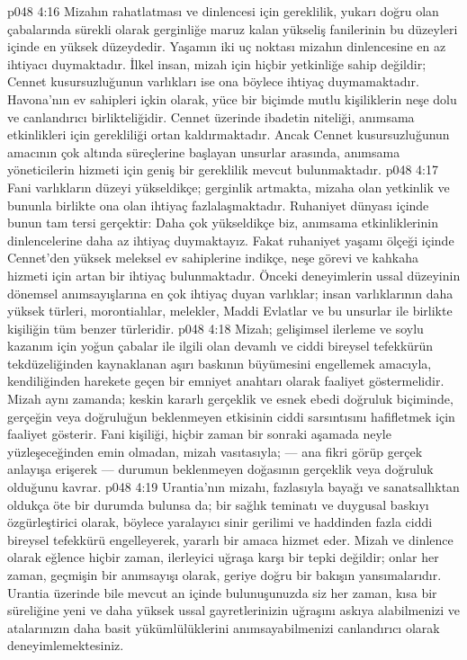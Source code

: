 \vs p048 4:16 Mizahın rahatlatması ve dinlencesi için gereklilik, yukarı doğru olan çabalarında sürekli olarak gerginliğe maruz kalan yükseliş fanilerinin bu düzeyleri içinde en yüksek düzeydedir. Yaşamın iki uç noktası mizahın dinlencesine en az ihtiyacı duymaktadır. İlkel insan, mizah için hiçbir yetkinliğe sahip değildir; Cennet kusursuzluğunun varlıkları ise ona böylece ihtiyaç duymamaktadır. Havona’nın ev sahipleri içkin olarak, yüce bir biçimde mutlu kişiliklerin neşe dolu ve canlandırıcı birlikteliğidir. Cennet üzerinde ibadetin niteliği, anımsama etkinlikleri için gerekliliği ortan kaldırmaktadır. Ancak Cennet kusursuzluğunun amacının çok altında süreçlerine başlayan unsurlar arasında, anımsama yöneticilerin hizmeti için geniş bir gereklilik mevcut bulunmaktadır.
\vs p048 4:17 Fani varlıkların düzeyi yükseldikçe; gerginlik artmakta, mizaha olan yetkinlik ve bununla birlikte ona olan ihtiyaç fazlalaşmaktadır. Ruhaniyet dünyası içinde bunun tam tersi gerçektir: Daha çok yükseldikçe biz, anımsama etkinliklerinin dinlencelerine daha az ihtiyaç duymaktayız. Fakat ruhaniyet yaşamı ölçeği içinde Cennet’den yüksek meleksel ev sahiplerine indikçe, neşe görevi ve kahkaha hizmeti için artan bir ihtiyaç bulunmaktadır. Önceki deneyimlerin ussal düzeyinin dönemsel anımsayışlarına en çok ihtiyaç duyan varlıklar; insan varlıklarının daha yüksek türleri, morontialılar, melekler, Maddi Evlatlar ve bu unsurlar ile birlikte kişiliğin tüm benzer türleridir.
\vs p048 4:18 Mizah; gelişimsel ilerleme ve soylu kazanım için yoğun çabalar ile ilgili olan devamlı ve ciddi bireysel tefekkürün tekdüzeliğinden kaynaklanan aşırı baskının büyümesini engellemek amacıyla, kendiliğinden harekete geçen bir emniyet anahtarı olarak faaliyet göstermelidir. Mizah aynı zamanda; keskin kararlı gerçeklik ve esnek ebedi doğruluk biçiminde, gerçeğin veya doğruluğun beklenmeyen etkisinin ciddi sarsıntısını hafifletmek için faaliyet gösterir. Fani kişiliği, hiçbir zaman bir sonraki aşamada neyle yüzleşeceğinden emin olmadan, mizah vasıtasıyla; --- ana fikri görüp gerçek anlayışa erişerek --- durumun beklenmeyen doğasının gerçeklik veya doğruluk olduğunu kavrar.
\vs p048 4:19 Urantia’nın mizahı, fazlasıyla bayağı ve sanatsallıktan oldukça öte bir durumda bulunsa da; bir sağlık teminatı ve duygusal baskıyı özgürleştirici olarak, böylece yaralayıcı sinir gerilimi ve haddinden fazla ciddi bireysel tefekkürü engelleyerek, yararlı bir amaca hizmet eder. Mizah ve dinlence olarak eğlence hiçbir zaman, ilerleyici uğraşa karşı bir tepki değildir; onlar her zaman, geçmişin bir anımsayışı olarak, geriye doğru bir bakışın yansımalarıdır. Urantia üzerinde bile mevcut an içinde bulunuşunuzda siz her zaman, kısa bir süreliğine yeni ve daha yüksek ussal gayretlerinizin uğraşını askıya alabilmenizi ve atalarınızın daha basit yükümlülüklerini anımsayabilmenizi canlandırıcı olarak deneyimlemektesiniz.
